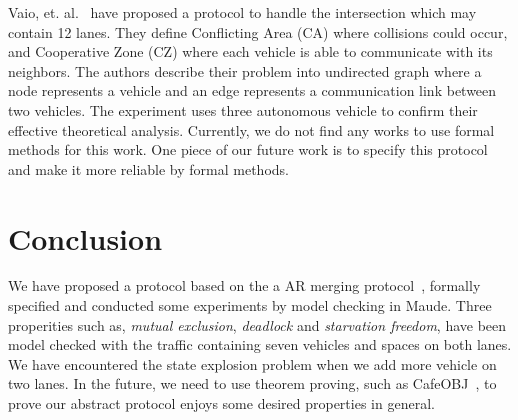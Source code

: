 \documentclass[10pt, conference, compsocconf]{IEEEtran}
\begin{document}
Vaio, et. al.~\cite{8790807} have proposed a protocol to handle the 
intersection which may contain 12 lanes.
They define Conflicting Area (CA) where collisions could occur, and 
Cooperative Zone (CZ) where each vehicle is able to communicate with its neighbors. 
The authors describe their problem into undirected graph where a node 
represents a vehicle and an edge represents a communication link between two vehicles.
The experiment uses three autonomous vehicle to confirm their effective theoretical analysis.
Currently, we do not find any works to use formal methods for this work.
One piece of our future work is to specify this protocol and make 
it more reliable by formal methods.
 
 








\section{Conclusion}
\label{concl_sect}

We have proposed a protocol based on the a AR merging protocol~\cite{10.1145/3055004.3055028}, 
formally specified and conducted some experiments by model checking in Maude.
Three properities such as, \textit{mutual exclusion}, \textit{deadlock} 
and \textit{starvation freedom}, have been model checked with the traffic 
containing seven vehicles and spaces on both lanes.
We have encountered the state explosion problem when we add more vehicle on two lanes.
In the future, we need to use theorem proving, such as CafeOBJ~\cite{DiaconescuF98}, 
to prove our abstract protocol enjoys some desired properties in general.


%
%
\end{document}
